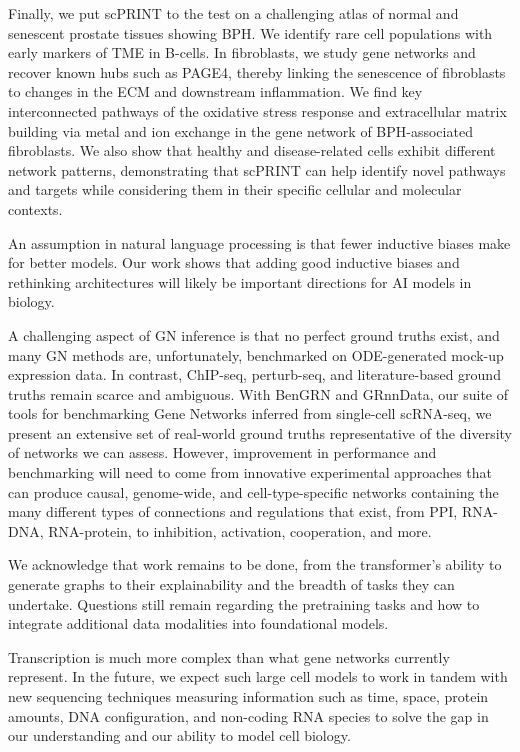 Finally, we put \gls{scPRINT} to the test on a challenging atlas of normal and senescent prostate tissues showing \gls{BPH}. We identify rare cell populations with early markers of \gls{TME} in B-cells. In fibroblasts, we study gene networks and recover known hubs such as PAGE4, thereby linking the senescence of fibroblasts to changes in the \gls{ECM} and downstream inflammation. We find key interconnected pathways of the oxidative stress response and extracellular matrix building via metal and ion exchange in the gene network of \gls{BPH}-associated fibroblasts. We also show that healthy and disease-related cells exhibit different network patterns, demonstrating that \gls{scPRINT} can help identify novel pathways and targets while considering them in their specific cellular and molecular contexts.

An assumption in natural language processing is that fewer inductive biases make for better models. Our work shows that adding good inductive biases and rethinking architectures will likely be important directions for \gls{AI} models in biology. 

A challenging aspect of \gls{GN} inference is that no perfect ground truths exist, and many \gls{GN} methods are, unfortunately, benchmarked on \gls{ODE}-generated mock-up expression data. In contrast, \gls{ChIP-seq}, perturb-seq, and literature-based ground truths remain scarce and ambiguous. With BenGRN and GRnnData, our suite of tools for benchmarking Gene Networks inferred from single-cell \gls{scRNA-seq}, we present an extensive set of real-world ground truths representative of the diversity of networks we can assess. However, improvement in performance and benchmarking will need to come from innovative experimental approaches that can produce causal, genome-wide, and cell-type-specific networks containing the many different types of connections and regulations that exist, from \gls{PPI}, \gls{RNA}-\gls{DNA}, \gls{RNA}-protein, to inhibition, activation, cooperation, and more.

We acknowledge that work remains to be done, from the transformer's ability to generate graphs to their explainability and the breadth of tasks they can undertake. Questions still remain regarding the pretraining tasks and how to integrate additional data modalities into foundational models.

Transcription is much more complex than what gene networks currently represent. In the future, we expect such large cell models to work in tandem with new sequencing techniques measuring information such as time, space, protein amounts, \gls{DNA} configuration, and non-coding \gls{RNA} species to solve the gap in our understanding and our ability to model cell biology.



%